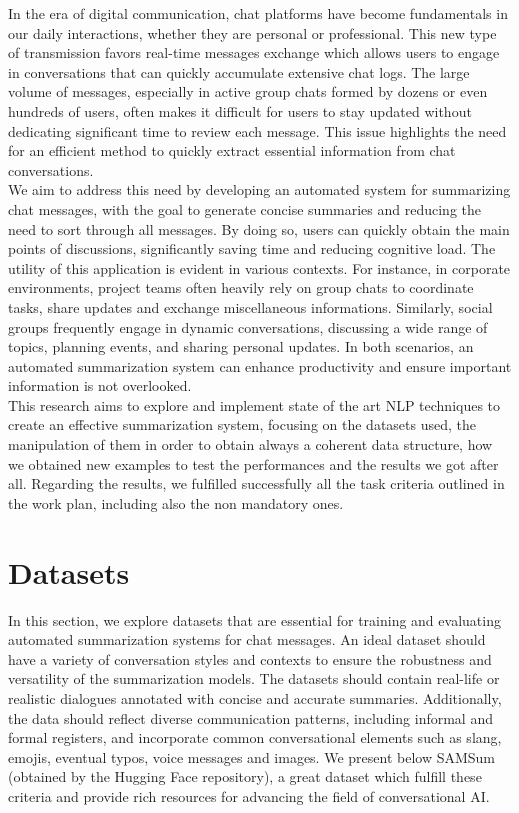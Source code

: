\documentclass[10pt,twocolumn,letterpaper]{article}
\begin{document}
In the era of digital communication, chat platforms have become fundamentals in our daily interactions, whether they are personal or professional. This new type of transmission favors real-time messages exchange which allows users to engage in conversations that can quickly accumulate extensive chat logs. The large volume of messages, especially in active group chats formed by dozens or even hundreds of users, often makes it difficult for users to stay updated without dedicating significant time to review each message. This issue highlights the need for an efficient method to quickly extract essential information from chat conversations. \\
We aim to address this need by developing an automated system for summarizing chat messages, with the goal to generate concise summaries and reducing the need to sort through all messages. By doing so, users can quickly obtain the main points of discussions, significantly saving time and reducing cognitive load. The utility of this application is evident in various contexts. For instance, in corporate environments, project teams often heavily rely on group chats to coordinate tasks, share updates and exchange miscellaneous informations. Similarly, social groups frequently engage in dynamic conversations, discussing a wide range of topics, planning events, and sharing personal updates. In both scenarios, an automated summarization system can enhance productivity and ensure important information is not overlooked. \\
This research aims to explore and implement state of the art NLP techniques to create an effective summarization system, focusing on the datasets used, the manipulation of them in order to obtain always a coherent data structure, how we obtained new examples to test the performances and the results we got after all.
Regarding the results, we fulfilled successfully all the task criteria outlined in the work plan, including also the non mandatory ones.

\section{Datasets}

In this section, we explore datasets that are essential for training and evaluating automated summarization systems for chat messages. An ideal dataset should have a variety of conversation styles and contexts to ensure the robustness and versatility of the summarization models. The datasets should contain real-life or realistic dialogues annotated with concise and accurate summaries. Additionally, the data should reflect diverse communication patterns, including informal and formal registers, and incorporate common conversational elements such as slang, emojis, eventual typos, voice messages and images. We present below SAMSum (obtained by the Hugging Face repository), a great dataset which fulfill these criteria and provide rich resources for advancing the field of conversational AI.
\end{document}
